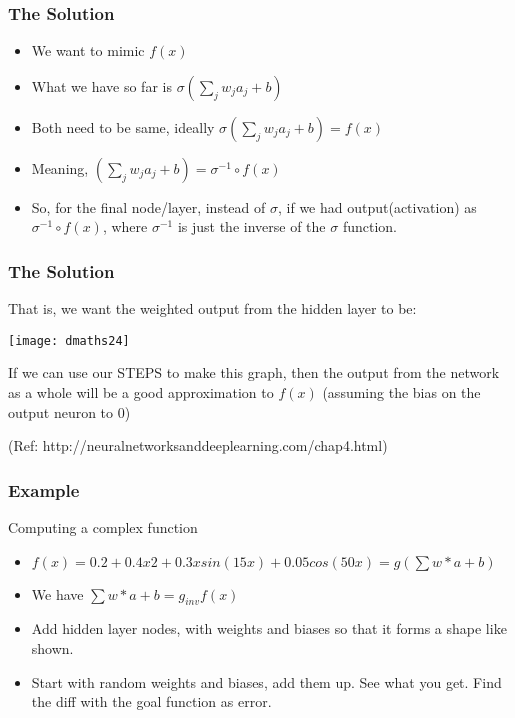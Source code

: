 \begin{frame}[fragile] \frametitle{The Solution}
\begin{itemize}
\item We want to mimic $f(x)$
\item What we have so far is $\sigma(\sum_j w_j a_j + b)$
\item Both need to be same, ideally $\sigma(\sum_j w_j a_j + b) = f(x)$
\item Meaning, $(\sum_j w_j a_j + b) = \sigma^{-1} \circ f(x)$
\item So, for the final node/layer, instead of $\sigma$, if we had output(activation) as $\sigma^{-1} \circ f(x)$, where $\sigma^{-1}$ is just the inverse of the $\sigma$ function.
\end{itemize}

\end{frame}


\begin{frame}[fragile] \frametitle{The Solution}

That is, we want the weighted output from the hidden layer to be:
\begin{center}
\texttt{[image: dmaths24]}
\end{center}

If we can use our STEPS to make this graph, then the output from the network as a whole will be a good approximation to $f(x)$ (assuming the bias on the output neuron to 0)

{\tiny (Ref: http://neuralnetworksanddeeplearning.com/chap4.html)}
\end{frame}



\begin{frame}[fragile] \frametitle{Example }
Computing a complex function
\begin{itemize}
\item $f(x)=0.2+0.4x2+0.3xsin(15x)+0.05cos(50x) = g(\sum w*a + b)$
\item We have $\sum w*a + b = g_{inv} f(x)$
\item Add hidden layer nodes, with weights and biases so that it forms a shape like shown.
\item Start with random weights and biases, add them up. See what you get. Find the diff with the goal function as error.
\end{itemize}

\end{frame}

